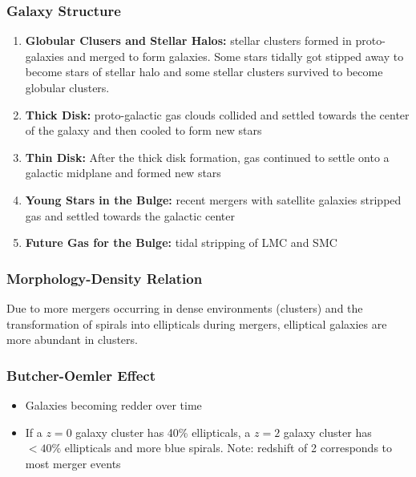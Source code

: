 \documentclass{book}
\begin{document}
\subsubsection{Galaxy Structure}
\begin{enumerate}
    \item \textbf{Globular Clusers and Stellar Halos:} stellar clusters formed in proto-galaxies and merged to form galaxies. Some stars tidally got stipped away to become stars of stellar halo and some stellar clusters survived to become globular clusters.
    \item \textbf{Thick Disk:} proto-galactic gas clouds collided and settled towards the center of the galaxy and then cooled to form new stars
    \item \textbf{Thin Disk:} After the thick disk formation, gas continued to settle onto a galactic midplane and formed new stars
    \item \textbf{Young Stars in the Bulge:} recent mergers with satellite galaxies stripped gas and settled towards the galactic center
    \item \textbf{Future Gas for the Bulge:} tidal stripping of LMC and SMC
\end{enumerate}
\subsubsection{Morphology-Density Relation}
Due to more mergers occurring in dense environments (clusters) and the transformation of spirals into ellipticals during mergers, elliptical galaxies are more abundant in clusters.
\subsubsection{Butcher-Oemler Effect}
\begin{itemize}
    \item Galaxies becoming redder over time
    \item If a $z = 0$ galaxy cluster has 40\% ellipticals, a $z = 2$ galaxy cluster has $< 40\%$ ellipticals and more blue spirals. Note: redshift of 2 corresponds to most merger events

\end{itemize}
\end{document}
